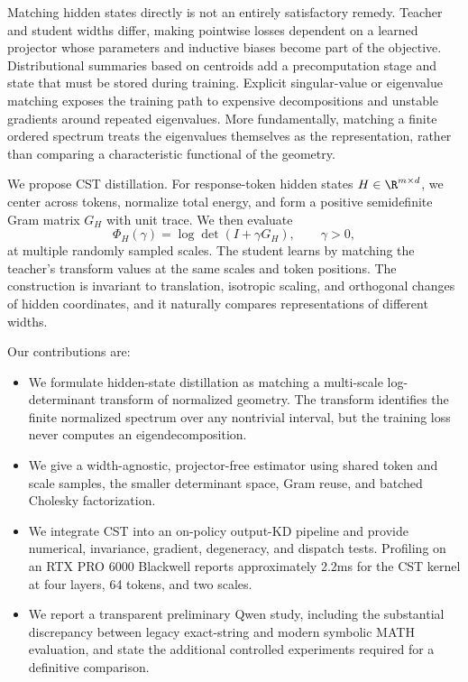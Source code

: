 \documentclass{article}
\newcommand{\cst}{\textsc{CST}}
\begin{document}
Matching hidden states directly is not an entirely satisfactory remedy.
Teacher and student widths differ, making pointwise losses dependent on a
learned projector whose parameters and inductive biases become part of the
objective.  Distributional summaries based on centroids add a precomputation
stage and state that must be stored during training.  Explicit singular-value
or eigenvalue matching exposes the training path to expensive decompositions
and unstable gradients around repeated eigenvalues.  More fundamentally,
matching a finite ordered spectrum treats the eigenvalues themselves as the
representation, rather than comparing a characteristic functional of the
geometry.

We propose \cst{} distillation.  For response-token hidden states
$H\in\R^{m\times d}$, we center across tokens, normalize total energy, and
form a positive semidefinite Gram matrix $G_H$ with unit trace.  We then
evaluate
\begin{equation}
  \Phi_H(\gamma)=\log\det(I+\gamma G_H),\qquad \gamma>0,
  \label{eq:transform}
\end{equation}
at multiple randomly sampled scales.  The student learns by matching the
teacher's transform values at the same scales and token positions.  The
construction is invariant to translation, isotropic scaling, and orthogonal
changes of hidden coordinates, and it naturally compares representations of
different widths.

Our contributions are:
\begin{itemize}
  \item We formulate hidden-state distillation as matching a multi-scale
  log-determinant transform of normalized geometry.  The transform identifies
  the finite normalized spectrum over any nontrivial interval, but the
  training loss never computes an eigendecomposition.
  \item We give a width-agnostic, projector-free estimator using shared token
  and scale samples, the smaller determinant space, Gram reuse, and batched
  Cholesky factorization.
  \item We integrate \cst{} into an on-policy output-KD pipeline and provide
  numerical, invariance, gradient, degeneracy, and dispatch tests.  Profiling
  on an RTX PRO 6000 Blackwell reports approximately 2.2ms for the \cst{}
  kernel at four layers, 64 tokens, and two scales.
  \item We report a transparent preliminary Qwen study, including the
  substantial discrepancy between legacy exact-string and modern symbolic
  MATH evaluation, and state the additional controlled experiments required
  for a definitive comparison.
\end{itemize}
\end{document}
